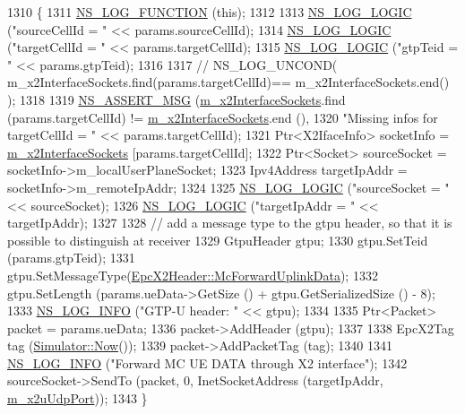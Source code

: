 \begin{DoxyCode}
1310 \{
1311   \hyperlink{log-macros-disabled_8h_a90b90d5bad1f39cb1b64923ea94c0761}{NS\_LOG\_FUNCTION} (\textcolor{keyword}{this});
1312 
1313   \hyperlink{group__logging_ga88acd260151caf2db9c0fc84997f45ce}{NS\_LOG\_LOGIC} (\textcolor{stringliteral}{"sourceCellId = "} << params.sourceCellId);
1314   \hyperlink{group__logging_ga88acd260151caf2db9c0fc84997f45ce}{NS\_LOG\_LOGIC} (\textcolor{stringliteral}{"targetCellId = "} << params.targetCellId);
1315   \hyperlink{group__logging_ga88acd260151caf2db9c0fc84997f45ce}{NS\_LOG\_LOGIC} (\textcolor{stringliteral}{"gtpTeid = "} << params.gtpTeid);
1316 
1317  \textcolor{comment}{// NS\_LOG\_UNCOND( m\_x2InterfaceSockets.find(params.targetCellId)== m\_x2InterfaceSockets.end() );}
1318 
1319   \hyperlink{assert_8h_aff5ece9066c74e681e74999856f08539}{NS\_ASSERT\_MSG} (\hyperlink{classns3_1_1EpcX2_a0665276228b9b99a52ef6d5e9bdb306d}{m\_x2InterfaceSockets}.find (params.targetCellId) != 
      \hyperlink{classns3_1_1EpcX2_a0665276228b9b99a52ef6d5e9bdb306d}{m\_x2InterfaceSockets}.end (),
1320                  \textcolor{stringliteral}{"Missing infos for targetCellId = "} << params.targetCellId);
1321   Ptr<X2IfaceInfo> socketInfo = \hyperlink{classns3_1_1EpcX2_a0665276228b9b99a52ef6d5e9bdb306d}{m\_x2InterfaceSockets} [params.targetCellId];
1322   Ptr<Socket> sourceSocket = socketInfo->m\_localUserPlaneSocket;
1323   Ipv4Address targetIpAddr = socketInfo->m\_remoteIpAddr;
1324 
1325   \hyperlink{group__logging_ga88acd260151caf2db9c0fc84997f45ce}{NS\_LOG\_LOGIC} (\textcolor{stringliteral}{"sourceSocket = "} << sourceSocket);
1326   \hyperlink{group__logging_ga88acd260151caf2db9c0fc84997f45ce}{NS\_LOG\_LOGIC} (\textcolor{stringliteral}{"targetIpAddr = "} << targetIpAddr);
1327 
1328   \textcolor{comment}{// add a message type to the gtpu header, so that it is possible to distinguish at receiver}
1329   GtpuHeader gtpu;
1330   gtpu.SetTeid (params.gtpTeid);
1331   gtpu.SetMessageType(\hyperlink{classns3_1_1EpcX2Header_a0e69b043a20eaee4c570f223f4eca715a57a81c6c7add0af11a6230b460268ce6}{EpcX2Header::McForwardUplinkData});
1332   gtpu.SetLength (params.ueData->GetSize () + gtpu.GetSerializedSize () - 8); 
1333   \hyperlink{group__logging_gafbd73ee2cf9f26b319f49086d8e860fb}{NS\_LOG\_INFO} (\textcolor{stringliteral}{"GTP-U header: "} << gtpu);
1334 
1335   Ptr<Packet> packet = params.ueData;
1336   packet->AddHeader (gtpu);
1337 
1338   EpcX2Tag tag (\hyperlink{classns3_1_1Simulator_ac3178fa975b419f7875e7105be122800}{Simulator::Now}());
1339   packet->AddPacketTag (tag);
1340 
1341   \hyperlink{group__logging_gafbd73ee2cf9f26b319f49086d8e860fb}{NS\_LOG\_INFO} (\textcolor{stringliteral}{"Forward MC UE DATA through X2 interface"});
1342   sourceSocket->SendTo (packet, 0, InetSocketAddress (targetIpAddr, \hyperlink{classns3_1_1EpcX2_aa0e3b62bf699a12b65309cb25f232974}{m\_x2uUdpPort}));  
1343 \}
\end{DoxyCode}


